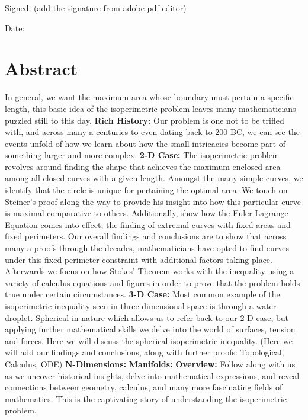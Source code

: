 \documentclass[a4paper]{book}
\begin{document}
\noindent
Signed: (add the signature from adobe pdf editor)


\bigskip

\noindent
Date: 

\chapter*{Abstract}
In general, we want the maximum area whose boundary must pertain a specific length, this basic idea of the isoperimetric problem leaves many mathematicians puzzled still to this day.
\newline
\newline
\textbf{Rich History:} Our problem is one not to be trifled with, and across many a centuries to even dating back to 200 BC, we can see the events unfold of how we learn about how the small intricacies become part of something larger and more complex. 
\newline
\newline
\textbf{2-D Case:} The isoperimetric problem revolves around finding the shape that achieves the maximum enclosed area among all closed curves with a given length. Amongst the many simple curves, we identify that the circle is unique for pertaining the optimal area. We touch on Steiner's proof along the way to provide his insight into how this particular curve is maximal comparative to others. Additionally, show how the Euler-Lagrange Equation comes into effect; the finding of extremal curves with fixed areas and fixed perimeters. Our overall findings and conclusions are to show that across many a proofs through the decades, mathematicians have opted to find curves under this fixed perimeter constraint with additional factors taking place. Afterwards we focus on how Stokes' Theorem works with the inequality using a variety of calculus equations and figures in order to prove that the problem holds true under certain circumstances.
\newline
\newline
\textbf{3-D Case:} Most common example of the isoperimetric inequality seen in three dimensional space is through a water droplet. Spherical in nature which allows us to refer back to our 2-D case, but applying further mathematical skills we delve into the world of surfaces, tension and forces. Here we will discuss the spherical isoperimetric inequality. (Here we will add our findings and conclusions, along with further proofs: Topological, Calculus, ODE)
\newline
\newline
\textbf{N-Dimensions:} 
\newline
\newline
\textbf{Manifolds:} 
\newline
\newline
\textbf{Overview:} Follow along with us as we uncover historical insights, delve into mathematical expressions, and reveal connections between geometry, calculus, and many more fascinating fields of mathematics. This is the captivating story of understanding the isoperimetric problem.
\end{document}
